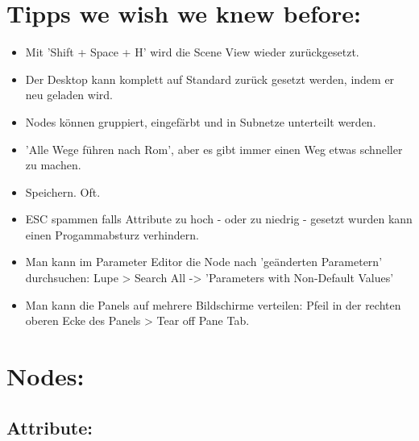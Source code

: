 \documentclass[paper=a4,fontsize=12pt,ngerman]{scrartcl}
\begin{document}
	\section*{\textcolor{rosa}{Tipps we wish we knew before:}}
	\begin{itemize}
		\item Mit 'Shift + Space + H' wird die Scene View wieder zurückgesetzt.
		\item Der Desktop kann komplett auf Standard zurück gesetzt werden, indem er neu geladen wird.
		\item Nodes können gruppiert, eingefärbt und in Subnetze unterteilt werden.
		\item 'Alle Wege führen nach Rom', aber es gibt immer einen Weg etwas schneller zu machen.
		\item Speichern. Oft.
		\item ESC spammen falls Attribute zu hoch - oder zu niedrig - gesetzt wurden kann einen Progammabsturz verhindern.
		\item Man kann im Parameter Editor die Node nach 'geänderten Parametern' durchsuchen: Lupe > Search All -> 'Parameters with Non-Default Values'
		\item Man kann die Panels auf mehrere Bildschirme verteilen: Pfeil in der rechten oberen Ecke des Panels > Tear off Pane Tab.
	\end{itemize}
		
	\section*{\textcolor{rosa}{Nodes:}}
	
	\subsection*{Attribute:}
\end{document}
